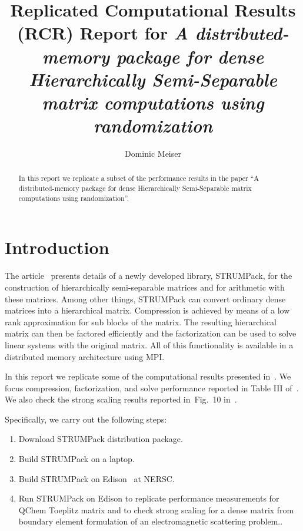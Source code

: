 \documentclass{acmsmall}
\begin{document}
\title{Replicated Computational Results (RCR) Report for
  \textit{A distributed-memory package for dense Hierarchically
    Semi-Separable matrix computations using randomization}}

\author{Dominic Meiser
}

\newcommand{\strumpack}{STRUMPack}

\begin{abstract}
  In this report we replicate a subset of the performance results
  in the paper ``A distributed-memory package for dense
  Hierarchically Semi-Separable matrix computations using
  randomization''.
\end{abstract}

\maketitle 

\section{Introduction}

The article~\cite{rouet:strumpack} presents details of a newly
developed library, \strumpack, for the construction of
hierarchically semi-separable matrices and for arithmetic with
these matrices.  Among other things,  \strumpack{} can convert
ordinary dense matrices into a hierarchical matrix.  Compression
is achieved by means of a low rank approximation for sub blocks
of the matrix.  The resulting hierarchical matrix can then be
factored efficiently and the factorization can be used to solve
linear systems with the original matrix.  All of this
functionality is available in a distributed memory architecture
using MPI.

In this report we replicate some of the computational results
presented in~\cite{rouet:strumpack}.  We focus compression,
factorization, and solve performance reported in Table III
of~\cite{rouet:strumpack}.  We also check the strong scaling
results reported in~Fig.~10 in~\cite{rouet:strumpack}.

Specifically, we carry out the following steps:
\begin{enumerate}
  \item Download \strumpack{} distribution package.
  \item Build \strumpack{} on a laptop.
  \item Build \strumpack{} on Edison~\cite{Edison} at NERSC.
  \item Run \strumpack{} on Edison to replicate performance
    measurements for QChem Toeplitz matrix and to check strong
    scaling for a dense matrix from boundary element formulation
    of an electromagnetic scattering problem..
\end{enumerate}
\end{document}
